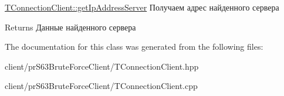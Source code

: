 \hyperlink{class_t_connection_client_afa458e30889d97faa2f1f8d9ee41e97e}{T\+Connection\+Client\+::get\+Ip\+Address\+Server} Получаем адрес найденного сервера 

\begin{DoxyReturn}{Returns}
Данные найденного сервера 
\end{DoxyReturn}


The documentation for this class was generated from the following files\+:\begin{DoxyCompactItemize}
\item 
client/pr\+S63\+Brute\+Force\+Client/T\+Connection\+Client.\+hpp\item 
client/pr\+S63\+Brute\+Force\+Client/T\+Connection\+Client.\+cpp\end{DoxyCompactItemize}
